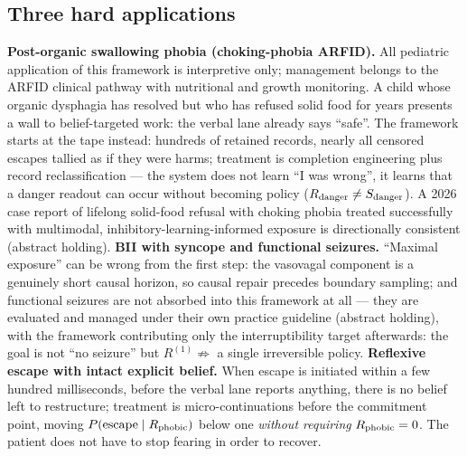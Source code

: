 \documentclass[9pt,twocolumn]{article}
\begin{document}
\subsection{Three hard applications}
\textbf{Post-organic swallowing phobia (choking-phobia ARFID).} All pediatric application of this framework is interpretive only; management belongs to the ARFID clinical pathway with nutritional and growth monitoring. A child whose organic dysphagia has resolved but who has refused solid food for years presents a wall to belief-targeted work: the verbal lane already says ``safe''. The framework starts at the tape instead: hundreds of retained records, nearly all censored escapes tallied as if they were harms; treatment is completion engineering plus record reclassification --- the system does not learn ``I was wrong'', it learns that a danger readout can occur without becoming policy ($R_{\rm danger}\neq S_{\rm danger}$). A 2026 case report of lifelong solid-food refusal with choking phobia treated successfully with multimodal, inhibitory-learning-informed exposure is directionally consistent \cite{finn2026} (abstract holding). \textbf{BII with syncope and functional seizures.} ``Maximal exposure'' can be wrong from the first step: the vasovagal component is a genuinely short causal horizon, so causal repair precedes boundary sampling; and functional seizures are not absorbed into this framework at all --- they are evaluated and managed under their own practice guideline \cite{tolchin2026} (abstract holding), with the framework contributing only the interruptibility target afterwards: the goal is not ``no seizure'' but $R^{(1)}\not\Rightarrow$ a single irreversible policy. \textbf{Reflexive escape with intact explicit belief.} When escape is initiated within a few hundred milliseconds, before the verbal lane reports anything, there is no belief left to restructure; treatment is micro-continuations before the commitment point, moving $P(\text{escape}\mid R_{\rm phobic})$ below one \emph{without requiring} $R_{\rm phobic}=0$. The patient does not have to stop fearing in order to recover.
\end{document}
